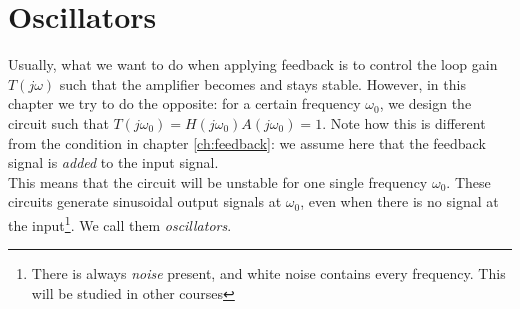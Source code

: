 \chapter{Oscillators}
Usually, what we want to do when applying feedback is to control the loop gain $T(j\omega)$ such that the amplifier becomes and stays stable. However, in this chapter we try to do the opposite: for a certain frequency $\omega_0$, we design the circuit such that $T(j\omega_0) = H(j\omega_0) A(j\omega_0) = 1$. Note how this is different from the condition in chapter \ref{ch:feedback}: we assume here that the feedback signal is \emph{added} to the input signal.\\
This means that the circuit will be unstable for one single frequency $\omega_0$. These circuits generate sinusoidal output signals at $\omega_0$, even when there is no signal at the input\footnote{There is always \emph{noise} present, and white noise contains every frequency. This will be studied in other courses}. We call them \emph{oscillators}.

